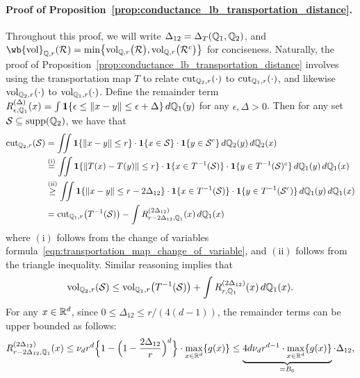 \paragraph{Proof of Proposition~\ref{prop:conductance_lb_transportation_distance}.}
	Throughout this proof, we will write $\Delta_{12} = \Delta_T(\mathbb{Q}_1,\mathbb{Q}_2)$, and $\wb{\vol}_{\mbb{Q},r}(\mc{R}) = \min\bigl\{\vol_{\mbb{Q},r}\bigl(\mc{R}\bigr),\vol_{\mbb{Q},r}\bigl(\mc{R}^c\bigr)\bigr\}$ for conciseness. Naturally, the proof of Proposition~\ref{prop:conductance_lb_transportation_distance} involves using the transportation map $T$ to relate $\mathrm{cut}_{\mathbb{Q}_2,r}(\cdot)$ to $\mathrm{cut}_{\mathbb{Q}_1,r}(\cdot)$, and likewise $\mathrm{vol}_{\mathbb{Q}_2,r}(\cdot)$ to $\mathrm{vol}_{\mathbb{Q}_1,r}(\cdot)$. Define the remainder term $R_{\epsilon,\mathbb{Q}_1}^{(\Delta)}(x) = \int \mathbf{1}\{\epsilon \leq \|x - y\| \leq \epsilon + \Delta\} \,d\mathbb{Q}_1(y)$ for any $\epsilon, \Delta > 0$. Then for any set $\mathcal{S} \subseteq \mathrm{supp}(\mathbb{Q}_2)$, we have that
	\begin{align}
	\mathrm{cut}_{\mathbb{Q}_2,r}(\mathcal{S}) & = \iint \mathbf{1}\{\|x - y\|\leq r\} \cdot \mathbf{1}\{x \in \mathcal{S} \} \cdot \mathbf{1}\{y \in \mathcal{S}^c \} \,d\mathbb{Q}_2(y) \,d\mathbb{Q}_2(x) \nonumber \\ 
	& \overset{\mathrm{(i)}}{=} \iint \mathbf{1}\{\|T(x) - T(y)\|\leq r\} \cdot \mathbf{1}\{x \in T^{-1}(\mathcal{S}) \} \cdot \mathbf{1}\{y \in T^{-1}(\mathcal{S})^c \} \,d\mathbb{Q}_1(y) \,d\mathbb{Q}_1(x) \nonumber \\
	& \overset{\mathrm{(ii)}}{\geq} \iint \mathbf{1}\{\|x - y\|\leq r - 2\Delta_{12}\} \cdot \mathbf{1}\{x \in T^{-1}(\mathcal{S}) \} \cdot \mathbf{1}\{y \in T^{-1}(\mathcal{S}^c) \} \,d\mathbb{Q}_1(y) \,d\mathbb{Q}_1(x) \nonumber \\
	& = \mathrm{cut}_{\mathbb{Q}_1,r}\bigl(T^{-1}(\mathcal{S})\bigr) - \int R_{r - 2\Delta_{12} ,\mathbb{Q}_1}^{(2\Delta_{12})}(x) \,d\mathbb{Q}_1(x) \label{pf:conductance_lb_transportation_distance_1}
	\end{align} 
	where $\mathrm{(i)}$ follows from the change of variables formula~\eqref{eqn:transportation_map_change_of_variable}, and $\mathrm{(ii)}$ follows from the triangle inequality. Similar reasoning implies that
	\begin{equation}
	\label{pf:conductance_lb_transportation_distance_2}
	\mathrm{vol}_{\mathbb{Q}_2,r}(\mathcal{S}) \leq \mathrm{vol}_{\mathbb{Q}_1,r}\bigl(T^{-1}(\mathcal{S})\bigr) + \int R_{r,\mathbb{Q}_1}^{(2\Delta_{12})}(x)  \,d\mathbb{Q}_1(x).
	\end{equation}
	For any $x \in \mathbb{R}^d$, since $0 \leq \Delta_{12} \leq r/(4(d - 1))$, the remainder terms can be upper bounded as follows:
	\begin{equation*}
	R_{r - 2\Delta_{12} ,\mathbb{Q}_1}^{(2\Delta_{12})}(x) \leq \nu_dr^d\Bigl\{1 - \Bigl(1 - \frac{2\Delta_{12}}{r}\Bigr)^d \Bigr\} \cdot \max_{x \in \mathbb{R}^d}\{g(x)\} \leq \underbrace{4 d \nu_d r^{d - 1} \cdot \max_{x \in \mathbb{R}^d}\{g(x)\}}_{= B_6} \cdot \Delta_{12},
	\end{equation*}
